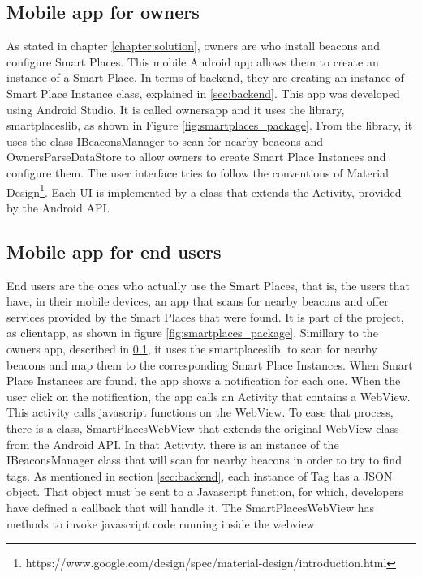 \subsection{Mobile app for owners}
\label{sub:mobile_app_for_owners}
As stated in chapter \ref{chapter:solution}, owners are who install beacons and configure Smart Places. This mobile Android app allows them to create an instance of a Smart Place.
In terms of backend, they are creating an instance of Smart Place Instance class, explained in \ref{sec:backend}.
This app was developed using Android Studio.
It is called ownersapp and it uses the library, smartplaceslib, as shown in Figure \ref{fig:smartplaces_package}.
From the library, it uses the class IBeaconsManager to scan for nearby beacons and OwnersParseDataStore to allow owners to create Smart Place Instances and configure them.
The user interface tries to follow the conventions of Material Design\footnote{https://www.google.com/design/spec/material-design/introduction.html}.
Each \gls{UI} is implemented by a class that extends the Activity, provided by the Android API.

\subsection{Mobile app for end users}
\label{sub:mobile_app_for_end_users}
End users are the ones who actually use the Smart Places, that is, the users that have, in their mobile devices, an app that scans for nearby beacons and offer services provided by the Smart Places that were found.
It is part of the project, as clientapp, as shown in figure \ref{fig:smartplaces_package}. Simillary to the owners app, described in \ref{sub:mobile_app_for_owners}, it uses the smartplaceslib, to scan for nearby beacons and map them to the corresponding Smart Place Instances.
When Smart Place Instances are found, the app shows a notification for each one.
When the user click on the notification, the app calls an Activity that contains a WebView. This activity calls javascript functions on the WebView.
To ease that process, there is a class, SmartPlacesWebView that extends the original WebView class from the Android \gls{API}.
In that Activity, there is an instance of the IBeaconsManager class that will scan for nearby beacons in order to try to find tags. As mentioned in section \ref{sec:backend},
each instance of Tag has a \gls{JSON} object. That object must be sent to a Javascript function, for which, developers have defined a callback that will handle it. The SmartPlacesWebView has methods to invoke javascript code running inside the webview.

